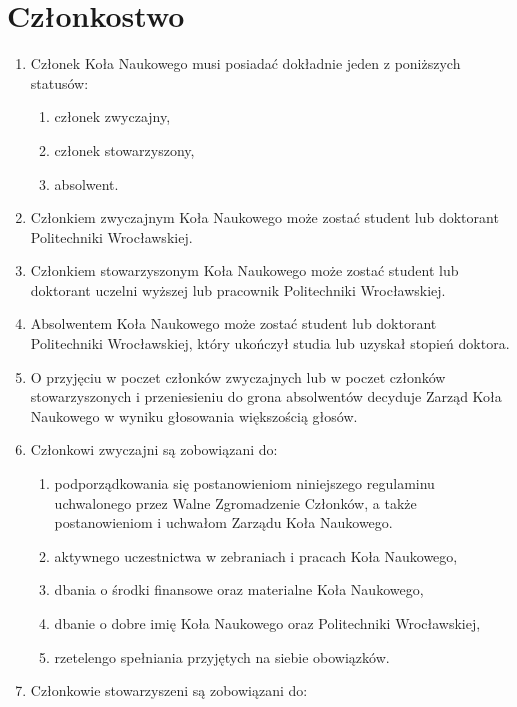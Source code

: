 \documentclass[12pt,a4paper]{article}
\begin{document}
    \section{Członkostwo}
    \begin{enumerate}
        \item Członek Koła Naukowego musi posiadać dokładnie jeden z poniższych statusów:    
            \begin{enumerate}
                \item członek zwyczajny,
                \item członek stowarzyszony,
                \item absolwent.
            \end{enumerate}
        \item Członkiem zwyczajnym Koła Naukowego może zostać student lub doktorant Politechniki Wrocławskiej.
        \item Członkiem stowarzyszonym Koła Naukowego może zostać student lub doktorant uczelni wyższej lub pracownik Politechniki Wrocławskiej.
        \item Absolwentem Koła Naukowego może zostać student lub doktorant Politechniki Wrocławskiej, który ukończył studia lub uzyskał stopień doktora.
        \item O przyjęciu w poczet członków zwyczajnych lub w poczet członków stowarzyszonych i przeniesieniu do grona absolwentów decyduje Zarząd Koła Naukowego w wyniku głosowania większością głosów.
        \item Członkowi zwyczajni są zobowiązani do: 
            \begin{enumerate}
                \item podporządkowania się postanowieniom niniejszego regulaminu uchwalonego przez Walne Zgromadzenie Członków,
                a także postanowieniom i uchwałom Zarządu Koła Naukowego.
                \item aktywnego uczestnictwa w zebraniach i pracach Koła Naukowego,
                \item dbania o środki finansowe oraz materialne Koła Naukowego,
                \item dbanie o dobre imię Koła Naukowego oraz Politechniki Wrocławskiej,
                \item rzetelengo spełniania przyjętych na siebie obowiązków.
            \end{enumerate}
        \item Członkowie stowarzyszeni są zobowiązani do:
            \begin{enumerate}

\end{enumerate}
\end{enumerate}
\end{document}
